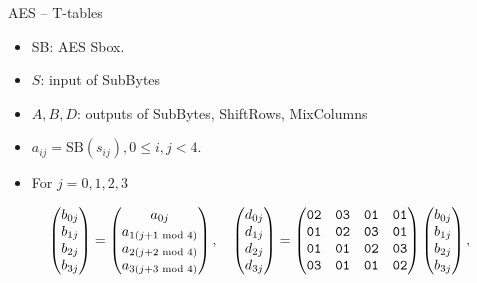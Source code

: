 \begin{frame}{AES -- T-tables}
    \begin{itemize}
    \item SB: AES Sbox.
    \item $S$: input of SubBytes
    \item $A, B, D$: outputs of SubBytes, ShiftRows, MixColumns
    \item $a_{ij}=\text{SB}(s_{ij}), 0\leq i,j<4$.
    \item For $j=0,1,2,3$
    \end{itemize}
\[
\begin{pmatrix}
    b_{0j}\\
    b_{1j}\\
    b_{2j}\\
    b_{3j}
    \end{pmatrix}
    =
    \begin{pmatrix}
    a_{0j}\\
    a_{1(j+1\textrm{~mod~} 4)}\\
    a_{2(j+2\textrm{~mod~} 4)}\\
    a_{3(j+3\textrm{~mod~} 4)}
    \end{pmatrix},\quad
    \begin{pmatrix}
    d_{0j}\\
    d_{1j}\\
    d_{2j}\\
    d_{3j}
    \end{pmatrix}
    =
    \begin{pmatrix}
    \texttt{02} & \texttt{03} & \texttt{01} & \texttt{01} \\
    \texttt{01} & \texttt{02} & \texttt{03} & \texttt{01} \\
    \texttt{01} & \texttt{01} & \texttt{02} & \texttt{03} \\
    \texttt{03} & \texttt{01} & \texttt{01} & \texttt{02}
    \end{pmatrix}
    \begin{pmatrix}
    b_{0j}\\
    b_{1j}\\
    b_{2j}\\
    b_{3j}
    \end{pmatrix},
\]
\end{frame}

